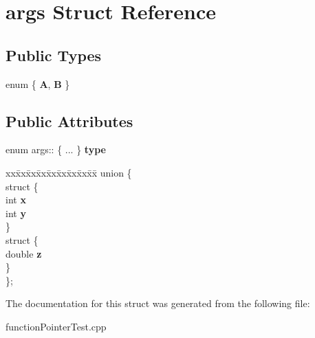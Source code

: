 \hypertarget{structargs}{}\section{args Struct Reference}
\label{structargs}
\subsection*{Public Types}
\begin{DoxyCompactItemize}
\item 
\hypertarget{structargs_a54c5a3a643a74c2e0dba4a3b8061d3e7}{}enum \{ {\bfseries A}, 
{\bfseries B}
 \}\label{structargs_a54c5a3a643a74c2e0dba4a3b8061d3e7}

\end{DoxyCompactItemize}
\subsection*{Public Attributes}
\begin{DoxyCompactItemize}
\item 
\hypertarget{structargs_a02a35dd00d558011e5c80e4b5083c649}{}enum args\+:: \{ ... \}  {\bfseries type}\label{structargs_a02a35dd00d558011e5c80e4b5083c649}

\item 
\hypertarget{structargs_a28ad94ec1e5034e6ce9a4d6be87475a0}{}\begin{tabbing}
xx\=xx\=xx\=xx\=xx\=xx\=xx\=xx\=xx\=\kill
union \{\\
\hypertarget{unionargs_1_1@1_afa6d8f0e9d79cc4603ad642ce19f883f}{}\>struct \{\\
\>\>int {\bfseries x}\\
\>\>int {\bfseries y}\\
\>\} \label{unionargs_1_1@1_afa6d8f0e9d79cc4603ad642ce19f883f}
\\
\hypertarget{unionargs_1_1@1_af071bca0f9407cbbf397f73a9e66ee60}{}\>struct \{\\
\>\>double {\bfseries z}\\
\>\} \label{unionargs_1_1@1_af071bca0f9407cbbf397f73a9e66ee60}
\\
\}; \label{structargs_a28ad94ec1e5034e6ce9a4d6be87475a0}
\\

\end{tabbing}\end{DoxyCompactItemize}


The documentation for this struct was generated from the following file\+:\begin{DoxyCompactItemize}
\item 
function\+Pointer\+Test.\+cpp\end{DoxyCompactItemize}
